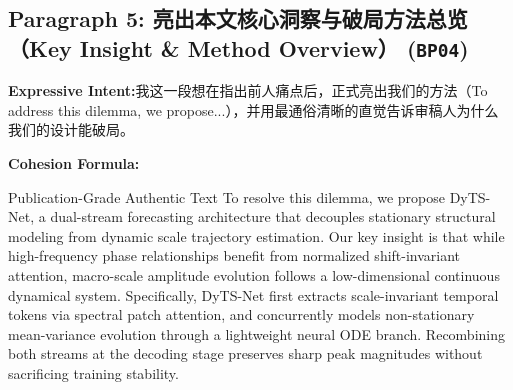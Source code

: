 \subsection*{Paragraph 5: 亮出本文核心洞察与破局方法总览（Key Insight \& Method Overview） (\texttt{BP04})}
\noindent\textbf{Expressive Intent:}\enspace 我这一段想在指出前人痛点后，正式亮出我们的方法（To address this dilemma, we propose...），并用最通俗清晰的直觉告诉审稿人为什么我们的设计能破局。\par
\noindent\textbf{Cohesion Formula:}\par\vspace{4pt}
\begin{ExampleBox}{Publication-Grade Authentic Text}
To resolve this dilemma, we propose DyTS-Net, a dual-stream forecasting architecture that decouples stationary structural modeling from dynamic scale trajectory estimation. Our key insight is that while high-frequency phase relationships benefit from normalized shift-invariant attention, macro-scale amplitude evolution follows a low-dimensional continuous dynamical system. Specifically, DyTS-Net first extracts scale-invariant temporal tokens via spectral patch attention, and concurrently models non-stationary mean-variance evolution through a lightweight neural ODE branch. Recombining both streams at the decoding stage preserves sharp peak magnitudes without sacrificing training stability.
\end{ExampleBox}
